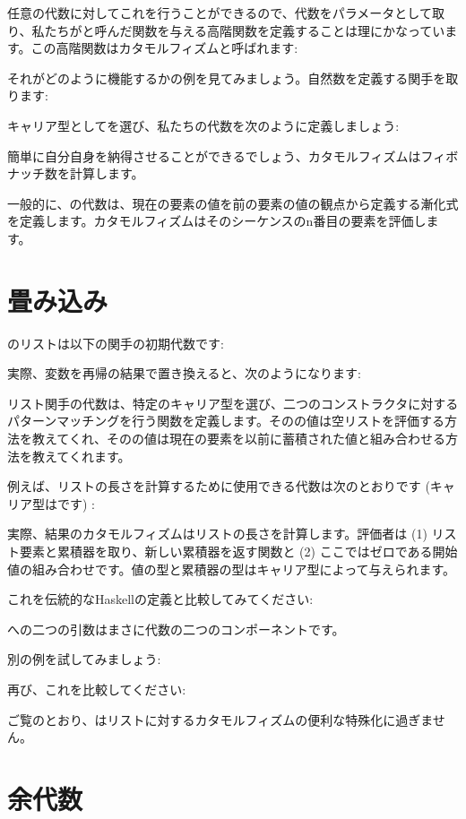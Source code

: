 任意の代数に対してこれを行うことができるので、代数をパラメータとして取り、私たちがと呼んだ関数を与える高階関数を定義することは理にかなっています。この高階関数はカタモルフィズムと呼ばれます: 

それがどのように機能するかの例を見てみましょう。自然数を定義する関手を取ります: 

キャリア型としてを選び、私たちの代数を次のように定義しましょう: 

簡単に自分自身を納得させることができるでしょう、カタモルフィズムはフィボナッチ数を計算します。

一般的に、の代数は、現在の要素の値を前の要素の値の観点から定義する漸化式を定義します。カタモルフィズムはそのシーケンスのn番目の要素を評価します。

\section{畳み込み}

のリストは以下の関手の初期代数です: 

実際、変数を再帰の結果で置き換えると、次のようになります: 

リスト関手の代数は、特定のキャリア型を選び、二つのコンストラクタに対するパターンマッチングを行う関数を定義します。そのの値は空リストを評価する方法を教えてくれ、そのの値は現在の要素を以前に蓄積された値と組み合わせる方法を教えてくれます。

例えば、リストの長さを計算するために使用できる代数は次のとおりです (キャリア型はです) : 

実際、結果のカタモルフィズムはリストの長さを計算します。評価者は (1) リスト要素と累積器を取り、新しい累積器を返す関数と (2) ここではゼロである開始値の組み合わせです。値の型と累積器の型はキャリア型によって与えられます。

これを伝統的なHaskellの定義と比較してみてください: 

への二つの引数はまさに代数の二つのコンポーネントです。

別の例を試してみましょう: 

再び、これを比較してください: 

ご覧のとおり、はリストに対するカタモルフィズムの便利な特殊化に過ぎません。

\section{余代数}

